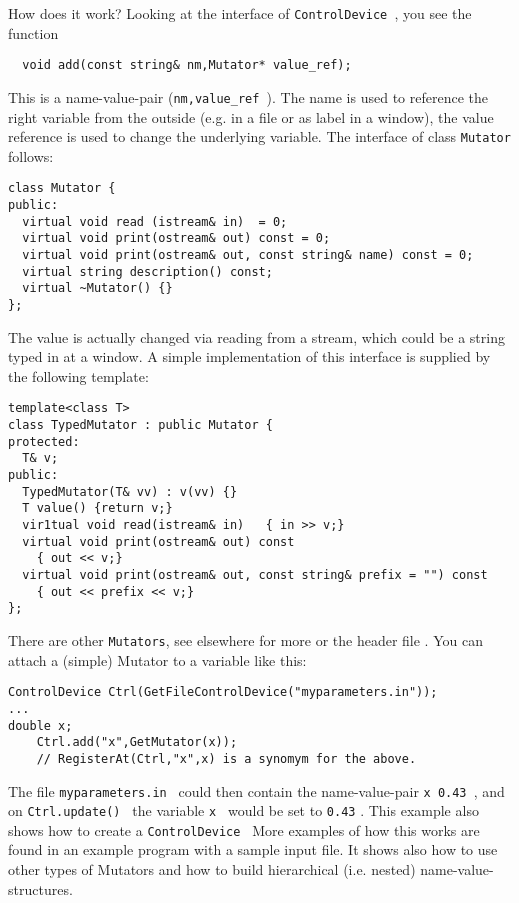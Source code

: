 \documentclass{article}
\begin{document}
    How does it work? Looking at the interface of {\tt  ControlDevice }, 
    you see the function 
\begin{verbatim}
  void add(const string& nm,Mutator* value_ref);
\end{verbatim}
   This is a name-value-pair ({\tt nm,value\_ref }). The name is used
    to reference the right variable from the outside (e.g. in a file or as
    label in a window), the value reference is used to change the underlying
    variable. The interface of class {\tt  Mutator } follows:
    
\begin{verbatim}
class Mutator {
public:
  virtual void read (istream& in)  = 0;
  virtual void print(ostream& out) const = 0;
  virtual void print(ostream& out, const string& name) const = 0;
  virtual string description() const;
  virtual ~Mutator() {}
};
\end{verbatim}

    The value is actually changed via reading from a stream, which could be a string
    typed in at a window. A simple implementation of this interface is supplied
    by the following template:

\begin{verbatim}
template<class T>
class TypedMutator : public Mutator {
protected:
  T& v;
public:
  TypedMutator(T& vv) : v(vv) {}
  T value() {return v;}
  vir1tual void read(istream& in)   { in >> v;}
  virtual void print(ostream& out) const 
    { out << v;}
  virtual void print(ostream& out, const string& prefix = "") const 
    { out << prefix << v;}
};
\end{verbatim}

There are other {\tt  Mutators}, see  elsewhere  for more
or the  header file . You can attach a (simple) Mutator
to  a variable like this:

\begin{verbatim}
ControlDevice Ctrl(GetFileControlDevice("myparameters.in"));
...
double x;
    Ctrl.add("x",GetMutator(x));
    // RegisterAt(Ctrl,"x",x) is a synomym for the above.
\end{verbatim}

The file {\tt  myparameters.in } could then contain the name-value-pair
{\tt  x 0.43 }, and on {\tt  Ctrl.update() } the variable {\tt  x } 
would be set
to {\tt  0.43} . This example also shows how to create a {\tt  ControlDevice }
More examples of how this works are found in an 
example program  
with a  sample input file.
It shows also how to use other types of Mutators and how
to build hierarchical (i.e. nested) name-value-structures.
\end{document}
